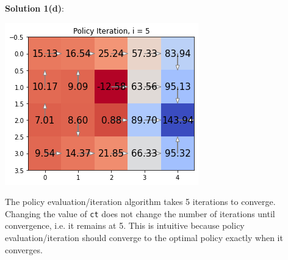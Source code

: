 \documentclass[submit]{harvardml}
\begin{document}
\textbf{Solution 1(d)}:\\
\begin{center}
    \includegraphics[width=0.5\linewidth]{HW6/plots/1d.ct=0.01.png}
\end{center}
The policy evaluation/iteration algorithm takes 5 iterations to converge. Changing the value of \texttt{ct} does not change the number of iterations until convergence, i.e. it remains at 5. This is intuitive because policy evaluation/iteration should converge to the optimal policy exactly when it converges. 
\newpage
\end{document}
